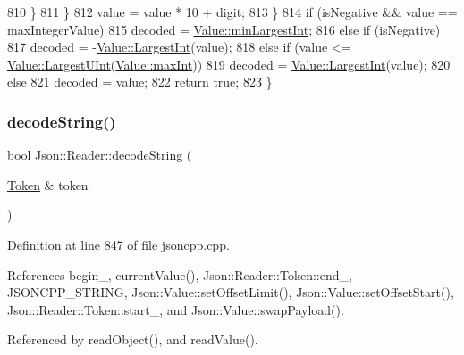 \begin{DoxyCode}
810       \}
811     \}
812     value = value * 10 + digit;
813   \}
814   \textcolor{keywordflow}{if} (isNegative && value == maxIntegerValue)
815     decoded = \hyperlink{class_json_1_1_value_af91df130daa50dd43d2cd89e6ee67706}{Value::minLargestInt};
816   \textcolor{keywordflow}{else} \textcolor{keywordflow}{if} (isNegative)
817     decoded = -\hyperlink{class_json_1_1_value_a1cbb82642ed05109b9833e49f042ece7}{Value::LargestInt}(value);
818   \textcolor{keywordflow}{else} \textcolor{keywordflow}{if} (value <= \hyperlink{class_json_1_1_value_a6682a3684d635e03fc06ba229fa24eec}{Value::LargestUInt}(\hyperlink{class_json_1_1_value_a978c799a8af3114ef7dab6fd0a310a1b}{Value::maxInt}))
819     decoded = \hyperlink{class_json_1_1_value_a1cbb82642ed05109b9833e49f042ece7}{Value::LargestInt}(value);
820   \textcolor{keywordflow}{else}
821     decoded = value;
822   \textcolor{keywordflow}{return} \textcolor{keyword}{true};
823 \}
\end{DoxyCode}
\mbox{\label{class_json_1_1_reader_aaf736937912f5c9b8d221e57f209e3e0}} 
\subsubsection{\texorpdfstring{decode\+String()}{decodeString()}\hspace{0.1cm}{\footnotesize\ttfamily [1/2]}}
{\footnotesize\ttfamily bool Json\+::\+Reader\+::decode\+String (\begin{DoxyParamCaption}\item[{\hyperlink{class_json_1_1_reader_1_1_token}{Token} \&}]{token }\end{DoxyParamCaption})\hspace{0.3cm}{\ttfamily [private]}}



Definition at line 847 of file jsoncpp.\+cpp.



References begin\+\_\+, current\+Value(), Json\+::\+Reader\+::\+Token\+::end\+\_\+, J\+S\+O\+N\+C\+P\+P\+\_\+\+S\+T\+R\+I\+NG, Json\+::\+Value\+::set\+Offset\+Limit(), Json\+::\+Value\+::set\+Offset\+Start(), Json\+::\+Reader\+::\+Token\+::start\+\_\+, and Json\+::\+Value\+::swap\+Payload().



Referenced by read\+Object(), and read\+Value().


